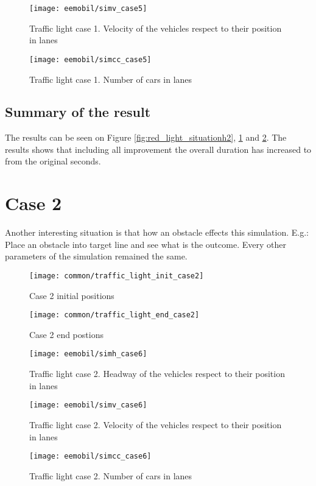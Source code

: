 			\begin{figure}
				\centering
				\texttt{[image: eemobil/simv\_case5]}
				\caption{Traffic light case 1. Velocity of the vehicles respect to their position in lanes}
				\label{fig:red_light_situationv2}
			\end{figure}
			\begin{figure}
				\centering
				\texttt{[image: eemobil/simcc\_case5]}
				\caption{Traffic light case 1. Number of cars in lanes }
				\label{fig:red_light_situationcc2}
			\end{figure}
			\subsection*{Summary of the result}
			The results can be seen on Figure \ref{fig:red_light_situationh2}, \ref{fig:red_light_situationv2} and \ref{fig:red_light_situationcc2}. The results shows that including all improvement the overall duration has increased to from the original seconds.
		\section{Case 2}
			Another interesting situation is that how an obstacle effects this simulation. E.g.: Place an obstacle into target line and see what is the outcome. Every other parameters of the simulation remained the same.
			\begin{figure}[ht]
				\centering
				\texttt{[image: common/traffic\_light\_init\_case2]}
				\caption{Case 2 initial positions}
				\label{fig:traffic_light_init2}
			\end{figure}
			\begin{figure}[ht]
				\centering
				\texttt{[image: common/traffic\_light\_end\_case2]}
				\caption{Case 2 end postions}
				\label{fig:traffic_light_end2}
			\end{figure}
			\begin{figure}
				\centering
				\texttt{[image: eemobil/simh\_case6]}
				\caption{Traffic light case 2. Headway of the vehicles respect to their position in lanes}
				\label{fig:red_light_situationh3}
			\end{figure}
			\begin{figure}
				\centering
				\texttt{[image: eemobil/simv\_case6]}
				\caption{Traffic light case 2. Velocity of the vehicles respect to their position in lanes}
				\label{fig:red_light_situationv3}
			\end{figure}
			\begin{figure}
				\centering
				\texttt{[image: eemobil/simcc\_case6]}
				\caption{Traffic light case 2. Number of cars in lanes }
				\label{fig:red_light_situationcc3}
			\end{figure}